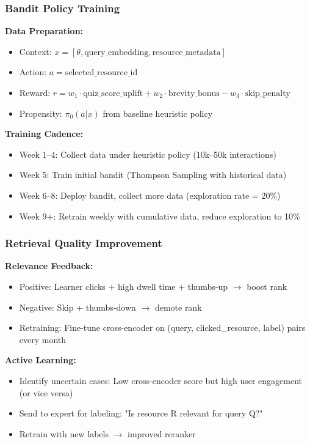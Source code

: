 \documentclass[11pt,letterpaper]{article}
\begin{document}
\subsubsection{Bandit Policy Training}\label{subsubsec:bandit-policy-training}

\textbf{Data Preparation:}
\begin{itemize}
\item Context: $x = [\theta, \text{query\_embedding}, \text{resource\_metadata}]$
\item Action: $a = \text{selected\_resource\_id}$
\item Reward: $r = w_1 \cdot \text{quiz\_score\_uplift} + w_2 \cdot \text{brevity\_bonus} - w_3 \cdot \text{skip\_penalty}$
\item Propensity: $\pi_0(a|x)$ from baseline heuristic policy
\end{itemize}

\textbf{Training Cadence:}
\begin{itemize}
\item Week 1--4: Collect data under heuristic policy (10k--50k interactions)
\item Week 5: Train initial bandit (Thompson Sampling with historical data)
\item Week 6--8: Deploy bandit, collect more data (exploration rate = 20\%)
\item Week 9+: Retrain weekly with cumulative data, reduce exploration to 10\%
\end{itemize}

\subsubsection{Retrieval Quality Improvement}\label{subsubsec:retrieval-quality-improvement}

\textbf{Relevance Feedback:}
\begin{itemize}
\item Positive: Learner clicks + high dwell time + thumbs-up $\rightarrow$ boost rank
\item Negative: Skip + thumbs-down $\rightarrow$ demote rank
\item Retraining: Fine-tune cross-encoder on (query, clicked\_resource, label) pairs every month
\end{itemize}

\textbf{Active Learning:}
\begin{itemize}
\item Identify uncertain cases: Low cross-encoder score but high user engagement (or vice versa)
\item Send to expert for labeling: "Is resource R relevant for query Q?"
\item Retrain with new labels $\rightarrow$ improved reranker
\end{itemize}
\end{document}
